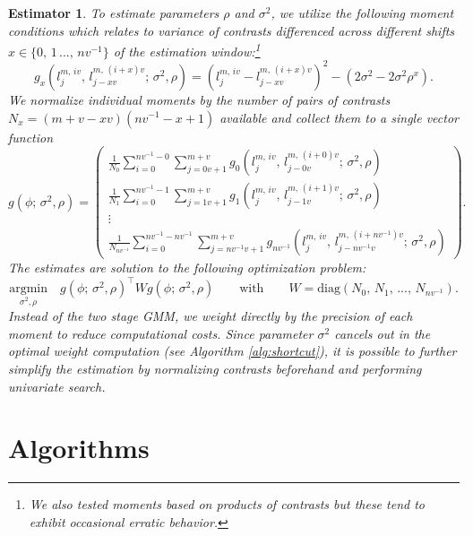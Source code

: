 \documentclass[11pt,dvipsnames]{article}
\newtheorem{estimator}{Estimator}
\begin{document}
\begin{appendices}
\begin{estimator}\label{est:GMM} 
To estimate parameters $\rho$ and $\sigma^{2}$, we utilize the following moment conditions which relates to variance of contrasts differenced across different shifts $x \in \{ 0,\,1\,...,\, nv^{-1}\}$ of the estimation window:\footnote{We also tested moments based on products of contrasts but these tend to exhibit occasional erratic behavior.}
\begin{equation}
  g_{x} (l_{j}^{m,\,iv },\, l_{j-xv}^{m,\,(i+x)v }; \, \sigma^{2},\rho) = \left( l_{j}^{m,\,iv }-  l_{j-xv}^{m,\,(i+x)v }\right)^2 - \left( 2 \sigma^2 - 2 \sigma^2 \rho^{x}\right).
\end{equation}
We normalize individual moments by the number of pairs of contrasts $N_x = \left(m+v-xv\right) \left(nv^{-1}-x+1\right)$ available and collect them to a single vector function
\begin{equation}
g(\phi ; \, \sigma^{2},\rho) =
\begin{pmatrix}
  \frac{1}{N_{0}} \sum_{i= 0}^{nv^{-1}-0} \sum_{j=0 v+1}^{m+v} g_{0} (l_{j}^{m,\,iv },\, l_{j-0 v}^{m,\,(i+0)v }; \, \sigma^{2},\rho)\\
  \frac{1}{N_{1}} \sum_{i= 0}^{nv^{-1}-1} \sum_{j=1 v+1}^{m+v} g_{1} (l_{j}^{m,\,iv },\, l_{j-1 v}^{m,\,(i+1)v }; \, \sigma^{2},\rho)\\
  \vdots\\
  \frac{1}{N_{nv^{-1}}} \sum_{i= 0}^{nv^{-1}-nv^{-1}} \sum_{j=nv^{-1} v+1}^{m+v} g_{nv^{-1}} (l_{j}^{m,\,iv },\, l_{j-nv^{-1} v}^{m,\,(i+nv^{-1})v }; \, \sigma^{2},\rho)
\end{pmatrix}.
\end{equation}
The estimates are solution to the following optimization problem:
\begin{equation}  
\underset{\sigma^2, \rho}{\mathrm{argmin}} \quad g(\phi ; \, \sigma^{2},\rho)^{\top} W g(\phi ; \, \sigma^{2},\rho) \qquad \textrm{with} \qquad W = \textrm{diag}(N_{0},\,N_{1},\,...,\,N_{nv^{-1}}).
\end{equation}
Instead of the two stage GMM, we weight directly by the precision of each moment to reduce computational costs. Since parameter $\sigma^{2}$ cancels out in the optimal weight computation (see Algorithm \ref{alg:shortcut}), it is possible to further simplify the estimation by normalizing contrasts beforehand and performing univariate search. 
\end{estimator}


\newpage
\section{Algorithms}\label{appendix:Algorithms}


\end{appendices}
\end{document}
